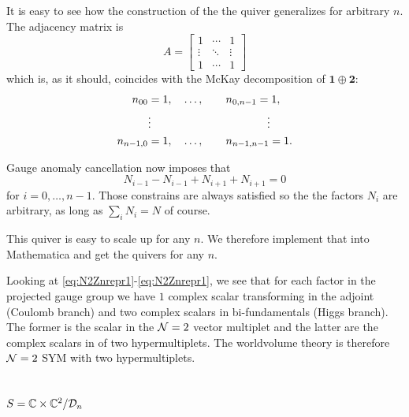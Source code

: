         It is easy to see how the construction of the the quiver generalizes for arbitrary $n$. The adjacency matrix is
        \begin{equation}
            A=
            \begin{bmatrix}
                1 & \cdots & 1 \\
                \vdots & \ddots & \vdots \\
                1 & \cdots & 1
            \end{bmatrix}
        \end{equation}
        which is, as it should, coincides with the McKay decomposition of $\boldsymbol{1}\oplus\boldsymbol{2}$:
        \begin{align}
            \begin{split}
                n_{00} &= 1,\quad\dots,\qquad n_{0,n-1}=1,\\
                &\vdots\hspace{3.7cm}\vdots\\
                n_{n-1,0} &= 1,\quad\dots,\qquad n_{n-1,n-1}=1.
            \end{split}
        \end{align}
        
        Gauge anomaly cancellation now imposes that
        \begin{equation}
            N_{i-1}-N_{i-1}+N_{i+1}+N_{i+1}=0
        \end{equation}
        for $i=0,\dots,n-1$. Those constrains are always satisfied so the the factors $N_i$ are arbitrary, as long as $\sum_iN_i=N$ of course.

        This quiver is easy to scale up for any $n$. We therefore implement that into Mathematica and get the quivers for any $n$.

        Looking at \eqref{eq:N2Znrepr1}-\eqref{eq:N2Znrepr1}, we see that for each factor in the projected gauge group we have $1$ complex scalar transforming in the adjoint (Coulomb branch) and two complex scalars in bi-fundamentals (Higgs branch). The former is the scalar in the $\mathcal{N}=2$ vector multiplet and the latter are the complex scalars in of two hypermultiplets. The worldvolume theory is therefore $\mathcal{N}=2$ SYM with two hypermultiplets.

    \subsection{$S=\mathbb{C}\times\mathbb{C}^2/\mathcal{D}_n$}

